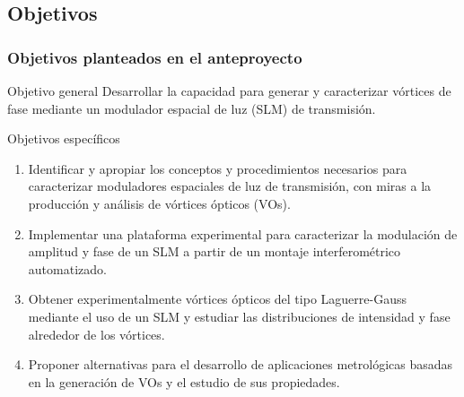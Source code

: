 \documentclass[xcolor=table,serif]{beamer}
\newif\ifplacelogo %
\begin{document}
\placelogotrue

\subsection{Objetivos}
\begin{frame}
  \frametitle{Objetivos planteados en el anteproyecto}
  \begin{block}{Objetivo general}
    Desarrollar la capacidad para generar y caracterizar vórtices de fase
    mediante un modulador espacial de luz (SLM) de transmisión. 
  \end{block}
  \begin{block}{Objetivos espec\'ificos}
    \small
    \begin{enumerate}
	\item Identificar y apropiar los conceptos y
                  procedimientos necesarios para caracterizar
                  moduladores espaciales de luz de transmisión, con
                  miras a la producción y análisis de vórtices
                  ópticos (VOs). 
        \item Implementar una plataforma experimental para
                  caracterizar la modulación de amplitud y fase de un
                  SLM a partir de un montaje interferométrico
                  automatizado. 
         \item Obtener experimentalmente vórtices ópticos del
                  tipo Laguerre-Gauss mediante el uso de un SLM y
                  estudiar las distribuciones de intensidad y fase
                  alrededor de los vórtices. 
         \item Proponer alternativas para el desarrollo de
                  aplicaciones metrológicas basadas en la generación
                  de VOs y el estudio de sus propiedades.
       \end{enumerate}
     \end{block}
   \end{frame}
\end{document}
